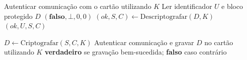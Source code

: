 \begin{algorithm}[htbp]
\begin{algorithmic}[1]
      \State Autenticar comunicação com o cartão utilizando $K$
      \State Ler identificador $U$ e bloco protegido $D$
        \Return $(\textbf{falso}, \bot, 0, 0)$
      \EndIf
      \State $(\mathit{ok}, S, C) \gets \mathrm{Descriptografar}(D, K)$ 
      \Return $(\mathit{ok}, U, S, C)$
    \EndFunction

      \State $D \gets \mathrm{Criptografar}(S, C, K)$ 
      \State Autenticar comunicação e gravar $D$ no cartão utilizando $K$
      \Return \textbf{verdadeiro} se gravação bem-sucedida; \textbf{falso} caso contrário
    \EndFunction
  \end{algorithmic}
\end{algorithm}
